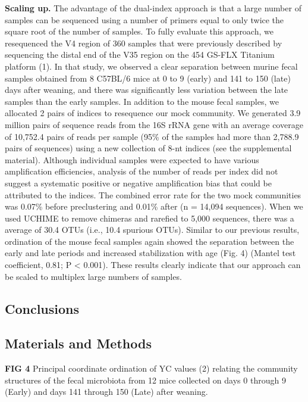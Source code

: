 \documentclass[11pt,]{article}
\begin{document}
\textbf{Scaling up.} The advantage of the dual-index approach is that a
large number of samples can be sequenced using a number of primers equal
to only twice the square root of the number of samples. To fully
evaluate this approach, we resequenced the V4 region of 360 samples that
were previously described by sequencing the distal end of the V35 region
on the 454 GS-FLX Titanium platform (1). In that study, we observed a
clear separation between murine fecal samples obtained from 8 C57BL/6
mice at 0 to 9 (early) and 141 to 150 (late) days after weaning, and
there was significantly less variation between the late samples than the
early samples. In addition to the mouse fecal samples, we allocated 2
pairs of indices to resequence our mock community. We generated 3.9
million pairs of sequence reads from the 16S rRNA gene with an average
coverage of 10,752.4 pairs of reads per sample (95\% of the samples had
more than 2,788.9 pairs of sequences) using a new collection of 8-nt
indices (see the supplemental material). Although individual samples
were expected to have various amplification efficiencies, analysis of
the number of reads per index did not suggest a systematic positive or
negative amplification bias that could be attributed to the indices. The
combined error rate for the two mock communities was 0.07\% before
preclustering and 0.01\% after (n = 14,094 sequences). When we used
UCHIME to remove chimeras and rarefied to 5,000 sequences, there was a
average of 30.4 OTUs (i.e., 10.4 spurious OTUs). Similar to our previous
results, ordination of the mouse fecal samples again showed the
separation between the early and late periods and increased
stabilization with age (Fig. 4) (Mantel test coefficient, 0.81; P
\textless{} 0.001). These results clearly indicate that our approach can
be scaled to multiplex large numbers of samples.

\subsection{Conclusions}\label{conclusions}

\subsection{Materials and Methods}\label{materials-and-methods}

\newpage

\textbf{FIG 4} Principal coordinate ordination of YC values (2) relating
the community structures of the fecal microbiota from 12 mice collected
on days 0 through 9 (Early) and days 141 through 150 (Late) after
weaning.
\end{document}
